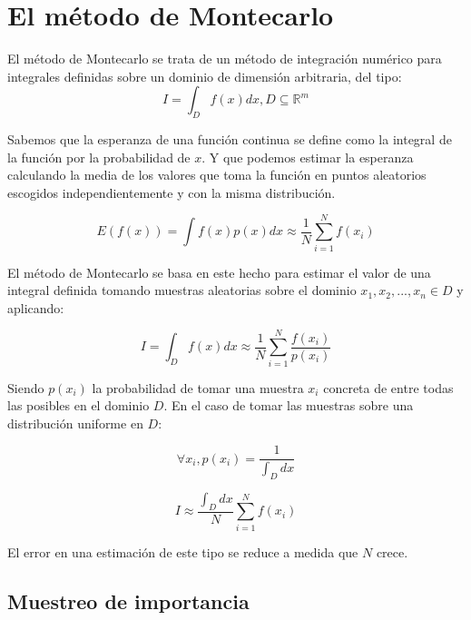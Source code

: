 \clearpage

\section{El método de Montecarlo}

El método de Montecarlo se trata de un método de integración numérico para integrales definidas sobre un dominio de dimensión arbitraria, del tipo:
\begin{equation}
I = \int_D f(x)dx , D \subseteq \mathbb{R}^m
\end{equation}

Sabemos que la esperanza de una función continua se define como la integral de la función por la probabilidad de $x$. Y que podemos estimar la esperanza calculando la media de los valores que toma la función en puntos aleatorios escogidos independientemente y con la misma distribución.

\begin{equation}
E(f(x)) = \int f(x)p(x)dx \approx \frac{1}{N} \sum _{i=1} ^N f(x_i) 
\end{equation}


El método de Montecarlo se basa en este hecho para estimar el valor de una integral definida tomando muestras aleatorias sobre el dominio $x_1, x_2, ..., x_n \in D$ y aplicando:

\begin{equation}
\label{eq:montecarlo}
I = \int_D f(x)dx \approx \frac{1}{N} \sum _{i=1} ^N \frac{f(x_i)}{p(x_i)} 
\end{equation}

Siendo $p(x_i)$ la probabilidad de tomar una muestra $x_i$ concreta de entre todas las posibles en el dominio $D$. En el caso de tomar las muestras sobre una distribución uniforme en $D$:

\begin{equation}
\forall x_i, p(x_i) = \frac{1}{\int _D dx}
\end{equation}

\begin{equation}
I \approx \frac{\int _D dx}{N} \sum_{i=1} ^N f(x_i)
\end{equation}

El error en una estimación de este tipo se reduce a medida que $N$ crece.
\clearpage

\subsection{Muestreo de importancia}
    

